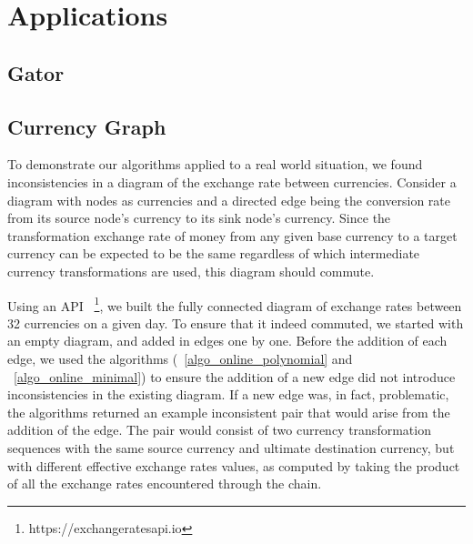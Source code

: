 \documentclass[sigplan,review,anonymous]{acmart}
\begin{document}
{\section{Applications}


\subsection{Gator}
\label{sec:gator}


\subsection{Currency Graph}
\label{sec:currency}

To demonstrate our algorithms applied to a real world situation, 
we found inconsistencies in a diagram of the exchange rate between currencies.
Consider a diagram with nodes as currencies and a directed edge being the
conversion rate from its source node's currency to its sink node's currency.
Since the transformation exchange rate of money from any given base currency to a target currency
can be expected to be the same regardless of which intermediate currency transformations
are used, this diagram should commute.

Using an API ~\footnote{https://exchangeratesapi.io}, we built the fully connected diagram of exchange rates between 32 currencies on a given day.
To ensure that it indeed commuted, we started with an empty diagram, and added in edges one by one.
Before the addition of each edge, we used the algorithms (~\ref{algo_online_polynomial} and ~\ref{algo_online_minimal}) to ensure the addition of a new edge did not introduce inconsistencies in the existing diagram.
If a new edge was, in fact, problematic, the algorithms returned an example inconsistent
pair that would arise from the addition of the edge.
The pair would consist of two currency transformation sequences with the 
same source currency and ultimate destination currency, but with different effective 
exchange rates values, as computed by taking the product of all the exchange rates
encountered through the chain.

}
\end{document}
